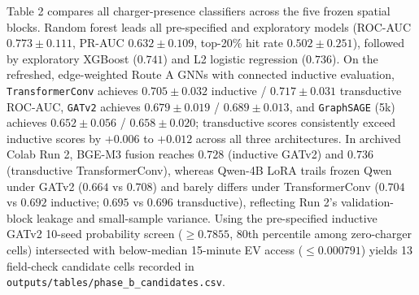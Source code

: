 \documentclass[11pt,a4paper]{article}
\begin{document}
Table 2 compares all charger-presence classifiers across the five frozen spatial blocks. Random forest leads all pre-specified and exploratory models (ROC-AUC \(0.773 \pm 0.111\), PR-AUC \(0.632 \pm 0.109\), top-20\% hit rate \(0.502 \pm 0.251\)), followed by exploratory XGBoost (\(0.741\)) and L2 logistic regression (\(0.736\)). On the refreshed, edge-weighted Route A GNNs with connected inductive evaluation, \texttt{TransformerConv} achieves \(0.705 \pm 0.032\) inductive / \(0.717 \pm 0.031\) transductive ROC-AUC, \texttt{GATv2} achieves \(0.679 \pm 0.019\) / \(0.689 \pm 0.013\), and \texttt{GraphSAGE} (5k) achieves \(0.652 \pm 0.056\) / \(0.658 \pm 0.020\); transductive scores consistently exceed inductive scores by \(+0.006\) to \(+0.012\) across all three architectures. In archived Colab Run 2, BGE-M3 fusion reaches \(0.728\) (inductive GATv2) and \(0.736\) (transductive TransformerConv), whereas Qwen-4B LoRA trails frozen Qwen under GATv2 (\(0.664\) vs \(0.708\)) and barely differs under TransformerConv (\(0.704\) vs \(0.692\) inductive; \(0.695\) vs \(0.696\) transductive), reflecting Run 2's validation-block leakage and small-sample variance. Using the pre-specified inductive GATv2 10-seed probability screen (\(\ge 0.7855\), 80th percentile among zero-charger cells) intersected with below-median 15-minute EV access (\(\le 0.000791\)) yields 13 field-check candidate cells recorded in \texttt{outputs/tables/phase\_b\_candidates.csv}.
\end{document}
